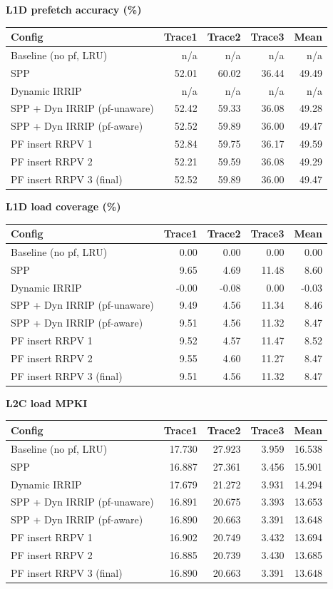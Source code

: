\textbf{L1D prefetch accuracy (\%)}\\[2pt]
\begin{tabular}{lrrrr}\toprule
Config & Trace1 & Trace2 & Trace3 & Mean \\ \midrule
Baseline (no pf, LRU) & n/a & n/a & n/a & n/a \\
SPP & 52.01 & 60.02 & 36.44 & 49.49 \\
Dynamic IRRIP & n/a & n/a & n/a & n/a \\
SPP + Dyn IRRIP (pf-unaware) & 52.42 & 59.33 & 36.08 & 49.28 \\
SPP + Dyn IRRIP (pf-aware) & 52.52 & 59.89 & 36.00 & 49.47 \\
PF insert RRPV 1 & 52.84 & 59.75 & 36.17 & 49.59 \\
PF insert RRPV 2 & 52.21 & 59.59 & 36.08 & 49.29 \\
PF insert RRPV 3 (final) & 52.52 & 59.89 & 36.00 & 49.47 \\
\bottomrule\end{tabular}
\medskip

\textbf{L1D load coverage (\%)}\\[2pt]
\begin{tabular}{lrrrr}\toprule
Config & Trace1 & Trace2 & Trace3 & Mean \\ \midrule
Baseline (no pf, LRU) & 0.00 & 0.00 & 0.00 & 0.00 \\
SPP & 9.65 & 4.69 & 11.48 & 8.60 \\
Dynamic IRRIP & -0.00 & -0.08 & 0.00 & -0.03 \\
SPP + Dyn IRRIP (pf-unaware) & 9.49 & 4.56 & 11.34 & 8.46 \\
SPP + Dyn IRRIP (pf-aware) & 9.51 & 4.56 & 11.32 & 8.47 \\
PF insert RRPV 1 & 9.52 & 4.57 & 11.47 & 8.52 \\
PF insert RRPV 2 & 9.55 & 4.60 & 11.27 & 8.47 \\
PF insert RRPV 3 (final) & 9.51 & 4.56 & 11.32 & 8.47 \\
\bottomrule\end{tabular}
\medskip

\textbf{L2C load MPKI}\\[2pt]
\begin{tabular}{lrrrr}\toprule
Config & Trace1 & Trace2 & Trace3 & Mean \\ \midrule
Baseline (no pf, LRU) & 17.730 & 27.923 & 3.959 & 16.538 \\
SPP & 16.887 & 27.361 & 3.456 & 15.901 \\
Dynamic IRRIP & 17.679 & 21.272 & 3.931 & 14.294 \\
SPP + Dyn IRRIP (pf-unaware) & 16.891 & 20.675 & 3.393 & 13.653 \\
SPP + Dyn IRRIP (pf-aware) & 16.890 & 20.663 & 3.391 & 13.648 \\
PF insert RRPV 1 & 16.902 & 20.749 & 3.432 & 13.694 \\
PF insert RRPV 2 & 16.885 & 20.739 & 3.430 & 13.685 \\
PF insert RRPV 3 (final) & 16.890 & 20.663 & 3.391 & 13.648 \\
\bottomrule\end{tabular}
\medskip


